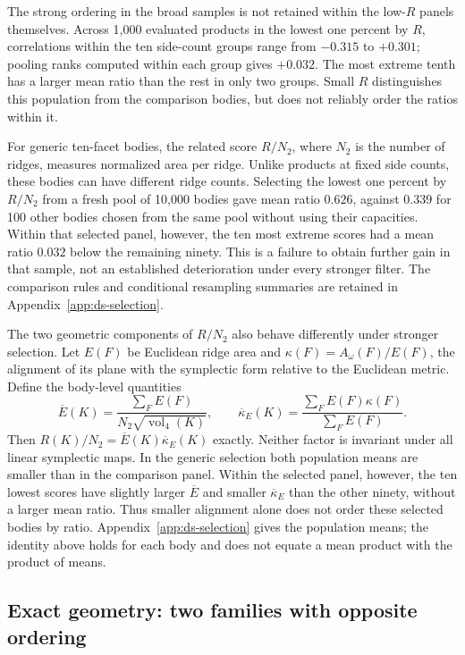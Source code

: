 The strong ordering in the broad samples is not retained within the
low-$R$ panels themselves. Across 1,000 evaluated products in the lowest
one percent by $R$, correlations within the ten side-count groups range
from $-0.315$ to $+0.301$; pooling ranks computed within each group gives
$+0.032$. The most extreme tenth has a larger mean ratio than the rest
in only two groups. Small $R$ distinguishes this population from the
comparison bodies, but does not reliably order the ratios within it.

For generic ten-facet bodies, the related score $R/N_2$, where $N_2$ is
the number of ridges, measures normalized area per ridge. Unlike products
at fixed side counts, these bodies can have different ridge counts.
Selecting the lowest one percent by $R/N_2$ from a fresh pool of 10,000
bodies gave mean ratio $0.626$, against $0.339$ for 100 other bodies
chosen from the same pool without using their capacities. Within that selected panel, however,
the ten most extreme scores had a mean ratio $0.032$ below the remaining
ninety. This is a failure to obtain further gain in that sample, not an
established deterioration under every stronger filter. The comparison
rules and conditional resampling summaries are retained in
Appendix~\ref{app:ds-selection}.

The two geometric components of $R/N_2$ also behave differently under
stronger selection. Let $E(F)$ be Euclidean ridge area and
$\kappa(F)=A_\omega(F)/E(F)$, the alignment of its plane with the
symplectic form relative to the Euclidean metric. Define the body-level
quantities
\[
 \overline E(K)=\frac{\sum_F E(F)}{N_2\sqrt{\operatorname{vol}_4(K)}},
 \qquad
 \overline\kappa_E(K)=\frac{\sum_F E(F)\kappa(F)}{\sum_F E(F)}.
\]
Then $R(K)/N_2=\overline E(K)\overline\kappa_E(K)$ exactly. Neither
factor is invariant under all linear symplectic maps. In the generic
selection both population means are smaller than in the comparison panel.
Within the selected panel, however, the ten lowest scores have slightly
larger $\overline E$ and smaller $\overline\kappa_E$ than the other
ninety, without a larger mean ratio. Thus smaller alignment alone does
not order these selected bodies by ratio. Appendix~\ref{app:ds-selection}
gives the population means; the identity above holds for each body and
does not equate a mean product with the product of means.

\subsection{Exact geometry: two families with opposite ordering}

